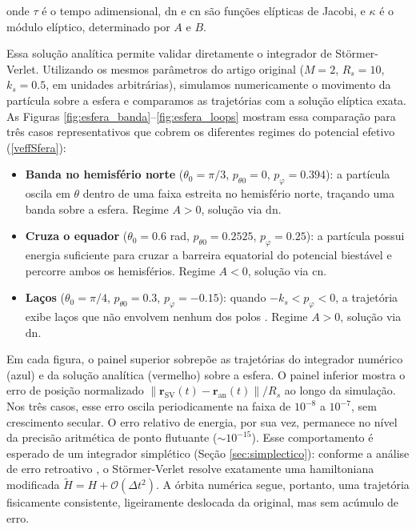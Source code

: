 \documentclass[twocolumn]{rbef}
\begin{document}
\noindent onde $\tau$ é o tempo adimensional, $\text{dn}$ e $\text{cn}$ são funções elípticas de Jacobi, e $\kappa$ é o módulo elíptico, determinado por $A$ e $B$.

Essa solução analítica permite validar diretamente o integrador de Störmer-Verlet. Utilizando os mesmos parâmetros do artigo original ($M = 2$, $R_s = 10$, $k_s = 0.5$, em unidades arbitrárias), simulamos numericamente o movimento da partícula sobre a esfera e comparamos as trajetórias com a solução elíptica exata. As Figuras \ref{fig:esfera_banda}--\ref{fig:esfera_loops} mostram essa comparação para três casos representativos que cobrem os diferentes regimes do potencial efetivo (\ref{veffSfera}):

\begin{itemize}
    \item \textbf{Banda no hemisfério norte} ($\theta_0 = \pi/3$, $p_{\theta 0} = 0$, $p_\varphi = 0.394$): a partícula oscila em $\theta$ dentro de uma faixa estreita no hemisfério norte, traçando uma banda sobre a esfera. Regime $A > 0$, solução via $\text{dn}$.
    \item \textbf{Cruza o equador} ($\theta_0 = 0.6$ rad, $p_{\theta 0} = 0.2525$, $p_\varphi = 0.25$): a partícula possui energia suficiente para cruzar a barreira equatorial do potencial biestável e percorre ambos os hemisférios. Regime $A < 0$, solução via $\text{cn}$.
    \item \textbf{Laços} ($\theta_0 = \pi/4$, $p_{\theta 0} = 0.3$, $p_\varphi = -0.15$): quando $-k_s < p_\varphi < 0$, a trajetória exibe laços que não envolvem nenhum dos polos \cite{StormerEsferico}. Regime $A > 0$, solução via $\text{dn}$.
\end{itemize}

Em cada figura, o painel superior sobrepõe as trajetórias do integrador numérico (azul) e da solução analítica (vermelho) sobre a esfera. O painel inferior mostra o erro de posição normalizado $\|\mathbf{r}_{\text{SV}}(t) - \mathbf{r}_{\text{an}}(t)\| / R_s$ ao longo da simulação. Nos três casos, esse erro oscila periodicamente na faixa de $10^{-8}$ a $10^{-7}$, sem crescimento secular. O erro relativo de energia, por sua vez, permanece no nível da precisão aritmética de ponto flutuante ($\sim 10^{-15}$). Esse comportamento é esperado de um integrador simplético (Seção \ref{sec:simplectico}): conforme a análise de erro retroativo \cite{stormer-verlet, Hairer2003}, o Störmer-Verlet resolve exatamente uma hamiltoniana modificada $\widetilde{H} = H + \mathcal{O}(\Delta t^2)$. A órbita numérica segue, portanto, uma trajetória fisicamente consistente, ligeiramente deslocada da original, mas sem acúmulo de erro.
\end{document}
